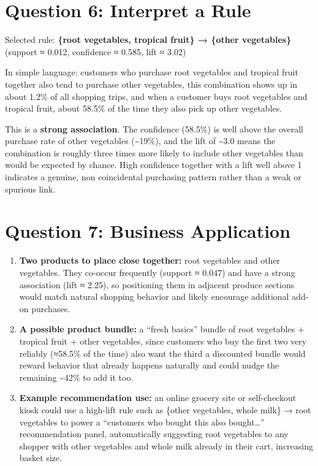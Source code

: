 \documentclass[
]{article}
\providecommand{\tightlist}{%
  \setlength{\itemsep}{0pt}\setlength{\parskip}{0pt}}
\begin{document}
\section{Question 6: Interpret a
Rule}\label{question-6-interpret-a-rule}

Selected rule: \textbf{\{root vegetables, tropical fruit\} → \{other
vegetables\}} (support ≈ 0.012, confidence ≈ 0.585, lift ≈ 3.02)

In simple language: customers who purchase root vegetables and tropical
fruit together also tend to purchase other vegetables, this combination
shows up in about 1.2\% of all shopping trips, and when a customer buys
root vegetables and tropical fruit, about 58.5\% of the time they also
pick up other vegetables.

This is a \textbf{strong association}. The confidence (58.5\%) is well
above the overall purchase rate of other vegetables
(\textasciitilde19\%), and the lift of \textasciitilde3.0 means the
combination is roughly three times more likely to include other
vegetables than would be expected by chance. High confidence together
with a lift well above 1 indicates a genuine, non coincidental
purchasing pattern rather than a weak or spurious link.

\section{Question 7: Business
Application}\label{question-7-business-application}

\begin{enumerate}
\def\labelenumi{\alph{enumi}.}
\tightlist
\item
  \textbf{Two products to place close together:} root vegetables and
  other vegetables. They co-occur frequently (support ≈ 0.047) and have
  a strong association (lift ≈ 2.25), so positioning them in adjacent
  produce sections would match natural shopping behavior and likely
  encourage additional add-on purchases.
\item
  \textbf{A possible product bundle:} a ``fresh basics'' bundle of root
  vegetables + tropical fruit + other vegetables, since customers who
  buy the first two very reliably (≈58.5\% of the time) also want the
  third a discounted bundle would reward behavior that already happens
  naturally and could nudge the remaining \textasciitilde42\% to add it
  too.
\item
  \textbf{Example recommendation use:} an online grocery site or
  self-checkout kiosk could use a high-lift rule such as \{other
  vegetables, whole milk\} → root vegetables to power a ``customers who
  bought this also bought\ldots{}'' recommendation panel, automatically
  suggesting root vegetables to any shopper with other vegetables and
  whole milk already in their cart, increasing basket size.
\end{enumerate}
\end{document}
